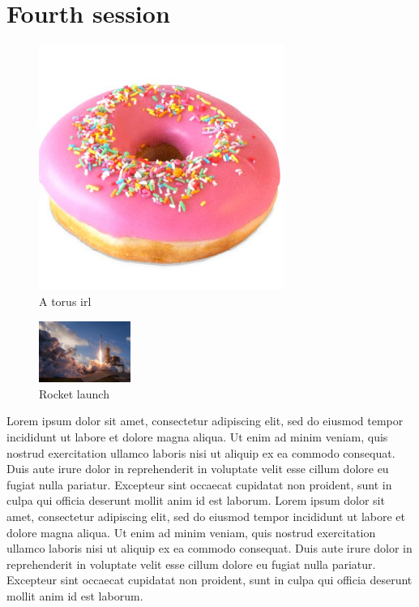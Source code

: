 \documentclass{article} %
\theoremstyle{definition}
\theoremstyle{definition}
\begin{document}
\section{Fourth session}
\begin{figure}[h]
    \centering
    \includegraphics[width=8cm,angle=45]{external-content.duckduckgo.com.jpg}
    \caption{A torus irl}
    \label{fig:my_label}
\end{figure}
\FloatBarrier
 
\begin{figure}
    \begin{center}
    \includegraphics[width=3cm]{1 cyZbIB2epiZEV8A3xlm0Kg.jpeg}
    \caption{Rocket launch}
    \label{fig:my_label}
    \end{center}
\end{figure}
Lorem ipsum dolor sit amet, consectetur adipiscing elit, sed do eiusmod tempor incididunt ut labore et dolore magna aliqua. Ut enim ad minim veniam, quis nostrud exercitation ullamco laboris nisi ut aliquip ex ea commodo consequat. Duis aute irure dolor in reprehenderit in voluptate velit esse cillum dolore eu fugiat nulla pariatur. Excepteur sint occaecat cupidatat non proident, sunt in culpa qui officia deserunt mollit anim id est laborum. Lorem ipsum dolor sit amet, consectetur adipiscing elit, sed do eiusmod tempor incididunt ut labore et dolore magna aliqua. Ut enim ad minim veniam, quis nostrud exercitation ullamco laboris nisi ut aliquip ex ea commodo consequat. Duis aute irure dolor in reprehenderit in voluptate velit esse cillum dolore eu fugiat nulla pariatur. Excepteur sint occaecat cupidatat non proident, sunt in culpa qui officia deserunt mollit anim id est laborum. 
\end{document}
